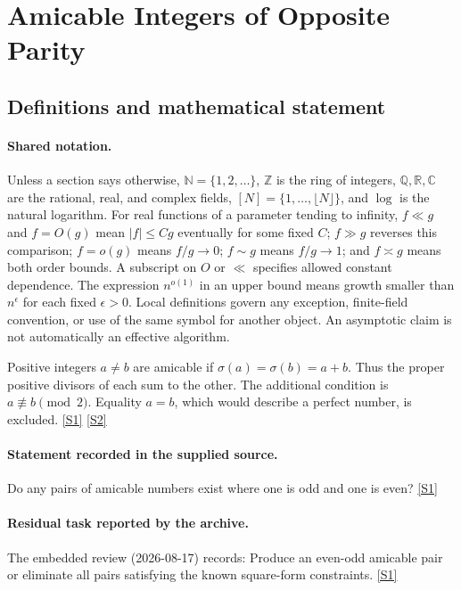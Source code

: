 \documentclass[11pt,a4paper]{article}
\newcommand{\N}{\mathbb{N}}
\newcommand{\Z}{\mathbb{Z}}
\newcommand{\Q}{\mathbb{Q}}
\newcommand{\R}{\mathbb{R}}
\newcommand{\C}{\mathbb{C}}
\newcommand{\sref}[2]{\hyperlink{source:#1:#2}{[S#2]}}
\begin{document}
\section{Amicable Integers of Opposite Parity}\label{statement}


\subsection{Definitions and mathematical statement}

\paragraph{Shared notation.}Unless a section says otherwise, $\N=\{1,2,\ldots\}$,
$\Z$ is the ring of integers, $\Q,\R,\C$ are the rational, real, and complex
fields, $[N]=\{1,\ldots,\lfloor N\rfloor\}$, and $\log$ is the natural
logarithm. For real functions of a parameter tending to infinity,
$f\ll g$ and $f=O(g)$ mean $|f|\leq Cg$ eventually for some fixed $C$;
$f\gg g$ reverses this comparison; $f=o(g)$ means $f/g\to0$;
$f\sim g$ means $f/g\to1$; and $f\asymp g$ means both order bounds.
A subscript on $O$ or $\ll$ specifies allowed constant dependence.
The expression $n^{o(1)}$ in an upper bound means growth smaller than
$n^\epsilon$ for each fixed $\epsilon>0$. Local definitions govern any
exception, finite-field convention, or use of the same symbol for another
object. An asymptotic claim is not automatically an effective algorithm.



Positive integers $a\ne b$ are amicable if $\sigma(a)=\sigma(b)=a+b$. Thus the proper positive divisors of each sum to the other. The additional condition is $a\not\equiv b\pmod2$. Equality $a=b$, which would describe a perfect number, is excluded. \sref{statement}{1} \sref{statement}{2}

\paragraph{Statement recorded in the supplied source.}
Do any pairs of amicable numbers exist where one is odd and one is even? \sref{statement}{1}

\paragraph{Residual task reported by the archive.}

The embedded review (2026-08-17) records: Produce an even-odd amicable pair or eliminate all pairs satisfying the known square-form constraints. \sref{statement}{1}
\end{document}
